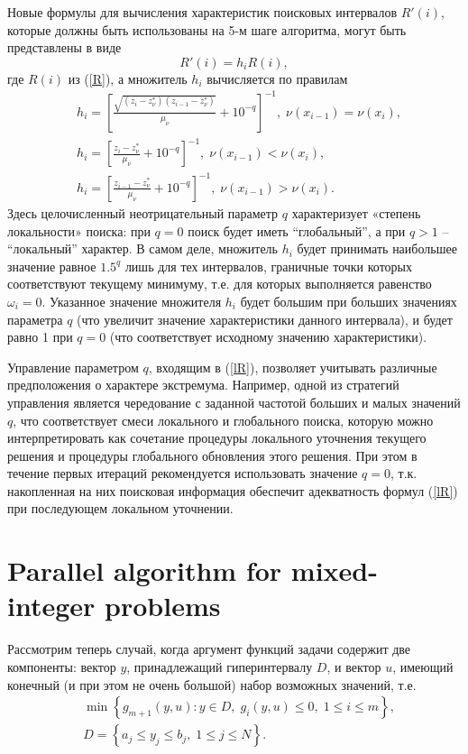 \documentclass[
11pt,%
tightenlines,%
twoside,%
onecolumn,%
nofloats,%
nobibnotes,%
nofootinbib,%
superscriptaddress,%
noshowpacs,%
centertags]%
{revtex4}
\begin{document}
Новые формулы для вычисления характеристик поисковых интервалов $R'(i)$, которые должны быть использованы на 5-м шаге алгоритма, могут быть представлены в виде 
\[
R'(i) = h_i R(i),
\]
где $R(i)$ из (\ref{R}), а множитель $h_i$ вычисляется по правилам
\begin{eqnarray}\label{lR}
& h_i = \left[\frac{\sqrt{(z_i-z_\nu^*)(z_{i-1}-z_\nu^*)}}{\mu_\nu}+10^{-q}\right]^{-1}, \; \nu(x_{i-1})=\nu(x_{i}),\nonumber\\
& h_i = \left[\frac{z_i-z_\nu^*}{\mu_\nu}+10^{-q}\right]^{-1}, \; \nu(x_{i-1})<\nu(x_{i}),\\
& h_i = \left[\frac{z_{i-1}-z_\nu^*}{\mu_\nu}+10^{-q}\right]^{-1}, \; \nu(x_{i-1})>\nu(x_{i}).\nonumber
\end{eqnarray}
Здесь целочисленный неотрицательный параметр $q$ характеризует «степень локальности» поиска: при $q=0$ поиск будет иметь ``глобальный'', а при $q>1$ -- ``локальный'' характер. 
В самом деле, множитель $h_i$ будет принимать наибольшее значение равное $1.5^q$ лишь для тех интервалов, граничные точки которых соответствуют текущему минимуму, т.е. для которых выполняется равенство $\omega_i = 0$. Указанное значение множителя $h_i$ будет большим при больших значениях параметра $q$ (что увеличит значение характеристики данного интервала), и будет равно 1 при $q=0$ (что соответствует исходному значению характеристики). 

Управление параметром $q$, входящим в (\ref{lR}), позволяет учитывать различные предположения о характере экстремума. Например, одной из стратегий управления является чередование с заданной частотой больших и малых значений $q$, что соответствует смеси локального и глобального поиска, которую можно интерпретировать как сочетание процедуры локального уточнения текущего решения и процедуры глобального обновления этого решения. При этом в течение первых итераций рекомендуется использовать значение $q=0$, т.к. накопленная на них поисковая информация обеспечит адекватность формул (\ref{lR}) при последующем локальном уточнении.


\section{Parallel algorithm for mixed-integer problems}

Рассмотрим теперь случай, когда аргумент функций задачи содержит две компоненты: вектор $y$, принадлежащий гиперинтервалу $D$, и вектор $u$, имеющий конечный (и при этом не очень большой) набор возможных значений, т.е. 
\begin{eqnarray}\label{problem_i}
& \min{\left\{ g_{m+1}(y,u):y\in D, \; g_i(y,u)\leq 0, \; 1 \leq i \leq m\right\}},\\
& D=\left\{a_j\leq y_j \leq b_j, \; 1\leq j \leq N \right\}.\nonumber
\end{eqnarray}
\end{document}
